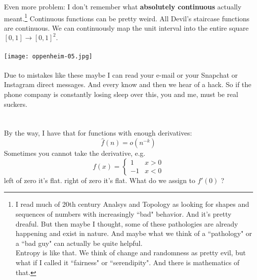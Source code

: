 \documentclass[12pt]{article}
\begin{document}
\newpage

\noindent Even more problem:  I don't remember what \textbf{absolutely continuous}  actually meant.\footnote{I read much of 20th century Analsys and Topology as looking for shapes and sequences of numbers with increasingly ``bad" behavior.  And it's pretty dreaful.  But then maybe I thought, some of these pathologies are already happening and exist in nature.  And maybe what we think of a ``pathology" or a ``bad guy" can actually be quite helpful.  \\ Entropy is like that.  We think of change and randomness as pretty evil, but what if I called it ``fairness" or ``serendipity".  And there is mathematics of that.}  Continuous functions can be pretty weird. All Devil's staircase functions are continuous.  We can continuously map the unit interval into the entire square $[0,1] \to [0,1]^2$.  \\ \\
\texttt{[image: oppenheim-05.jpg]} \\ \\
Due to mistakes like these maybe I can read your e-mail or your Snapchat or Instagram direct messages.  And every know and then we hear of a hack. So if the phone company is constantly losing sleep over this, you and me, must be real suckers.
\\ \\ \\
By the way, I have that for functions with enough derivatives:
$$ \hat{f}(n) = o(n^{-k}) $$
Sometimes you cannot take the derivative, e.g. 
$$
f(x) = \left\{  \begin{array}{rc} 1 & x > 0 \\ -1 & x < 0\end{array}\right. $$
left of zero it's flat. right of zero it's flat.  What do we assign to $f'(0)$ ? \\
\end{document}
